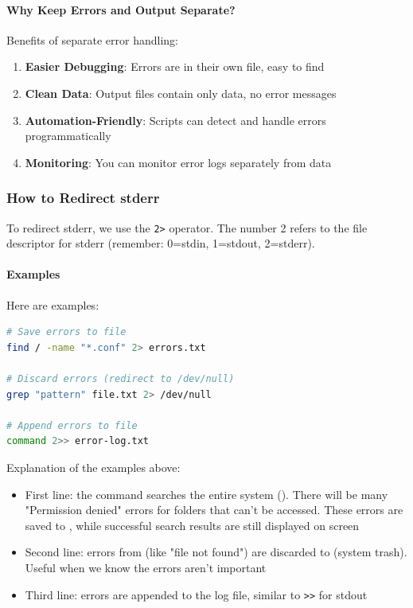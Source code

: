 \paragraph{Why Keep Errors and Output Separate?}

Benefits of separate error handling:
\begin{enumerate}
	\item \textbf{Easier Debugging}: Errors are in their own file, easy to find
	\item \textbf{Clean Data}: Output files contain only data, no error messages
	\item \textbf{Automation-Friendly}: Scripts can detect and handle errors programmatically
	\item \textbf{Monitoring}: You can monitor error logs separately from data
\end{enumerate}

\subsubsection{How to Redirect stderr}

To redirect stderr, we use the \texttt{2>} operator. The number 2 refers to the file descriptor for stderr (remember: 0=stdin, 1=stdout, 2=stderr).

\paragraph{Examples}

Here are examples:

\begin{lstlisting}[language=bash, caption={Redirecting stderr}]
# Save errors to file
find / -name "*.conf" 2> errors.txt

# Discard errors (redirect to /dev/null)
grep "pattern" file.txt 2> /dev/null

# Append errors to file
command 2>> error-log.txt
\end{lstlisting}

Explanation of the examples above:
\begin{itemize}
	\item First line: the  command searches the entire system (\dir{/}). There will be many "Permission denied" errors for folders that can't be accessed. These errors are saved to , while successful search results are still displayed on screen
	\item Second line: errors from  (like "file not found") are discarded to  (system trash). Useful when we know the errors aren't important
	\item Third line: errors are appended to the log file, similar to \texttt{>>} for stdout
\end{itemize}

